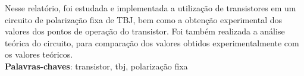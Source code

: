 \setlength{\absparsep}{18pt} %
 \begin{resumo}
Nesse relatório, foi estudada e implementada a utilização de transistores em um circuito de polarização fixa de TBJ, bem como a obtenção experimental dos valores dos pontos de operação do transistor. Foi também realizada a análise teórica do circuito, para comparação dos valores obtidos experimentalmente com os valores teóricos.\\
 \noindent
 \textbf{Palavras-chaves}: transistor, tbj, polarização fixa
\end{resumo} 